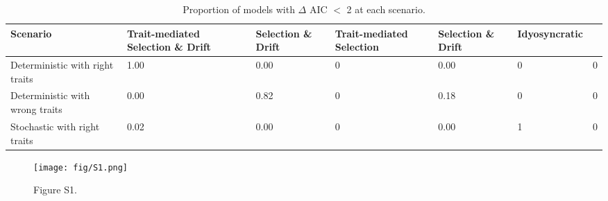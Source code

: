 \begin{table}[!ht]

\caption{\label{tab:table-prop}Proportion of models with {$\Delta$} AIC {$<$}  2 at each scenario.}
\centering
\begin{tabular}[t]{p{3cm}p{2.5cm}p{2.5cm}p{2.5cm}p{2.5cm}p{2.5cm}p{2.5cm}}
\toprule
\textbf{Scenario} & \textbf{Trait-mediated Selection} \& \textbf{Drift} & \textbf{Selection \& Drift} & \textbf{Trait-mediated Selection} & \textbf{Selection \& Drift} & \textbf{Idyosyncratic}\\
\hline
Deterministic with right traits & 1.00 & 0.00 & 0 & 0.00 & 0 & 0\\
Deterministic with wrong traits & 0.00 & 0.82 & 0 & 0.18 & 0 & 0\\
Stochastic with right traits & 0.02 & 0.00 & 0 & 0.00 & 1 & 0\\
\bottomrule
\end{tabular}
\end{table}

\begin{figure}
\centering
\texttt{[image: fig/S1.png]}
\caption{Figure S1.}
\end{figure}



